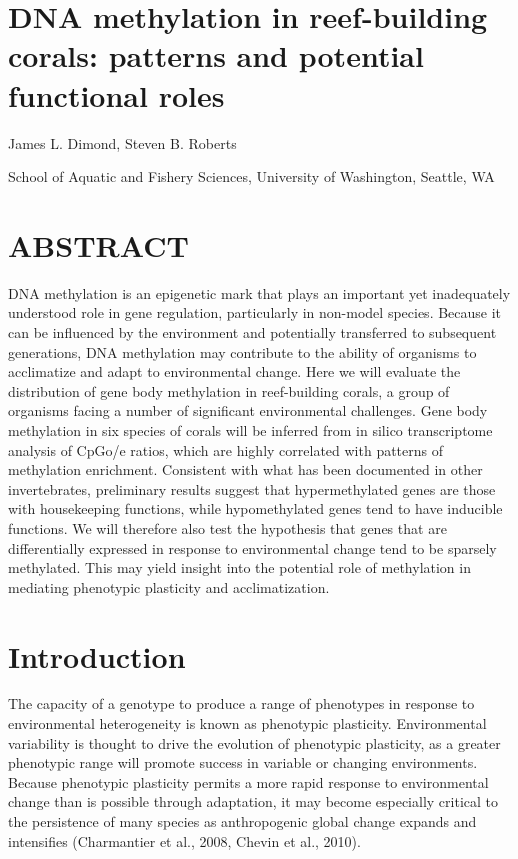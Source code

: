 \section{DNA methylation in reef-building corals: patterns and potential functional roles}


James L. Dimond, Steven B. Roberts

School of Aquatic and Fishery Sciences, University of Washington, Seattle, WA


\section{ABSTRACT}


DNA methylation is an epigenetic mark that plays an important yet inadequately understood role in gene regulation, particularly in non-model species. Because it can be influenced by the environment and potentially transferred to subsequent generations, DNA methylation may contribute to the ability of organisms to acclimatize and adapt to environmental change. Here we will evaluate the distribution of gene body methylation in reef-building corals, a group of organisms facing a number of significant environmental challenges. Gene body methylation in six species of corals will be inferred from in silico transcriptome analysis of CpGo/e ratios, which are highly correlated with patterns of methylation enrichment. Consistent with what has been documented in other invertebrates, preliminary results suggest that hypermethylated genes are those with housekeeping functions, while hypomethylated genes tend to have inducible functions. We will therefore also test the hypothesis that genes that are differentially expressed in response to environmental change tend to be sparsely methylated. This may yield insight into the potential role of methylation in mediating phenotypic plasticity and acclimatization. 

\section{Introduction}

 
The capacity of a genotype to produce a range of phenotypes in response to environmental heterogeneity is known as phenotypic plasticity. Environmental variability is thought to drive the evolution of phenotypic plasticity, as a greater phenotypic range will promote success in variable or changing environments. Because phenotypic plasticity permits a more rapid response to environmental change than is possible through adaptation, it may become especially critical to the persistence of many species as anthropogenic global change expands and intensifies (Charmantier et al., 2008, Chevin et al., 2010). 
 
